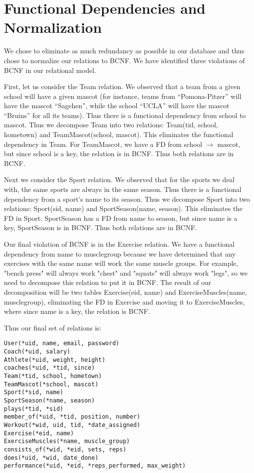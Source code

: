 \documentclass{article}
\begin{document}
\section{Functional Dependencies and Normalization}

We chose to eliminate as much redundancy as possible in our database and thus chose to normalize our relations to BCNF.  We have identified three violations of BCNF in our relational model. 

First, let us consider the Team relation.  We observed that a team from a given school 
will have a given mascot (for instance, teams from ``Pomona-Pitzer'' will have the mascot
``Sagehen'', while the school ``UCLA'' will have the mascot ``Bruins'' for all its teams). Thus there is 
a functional dependency from school to mascot. Thus we decompose Team into two relations:
Team(tid, school, hometown) and TeamMascot(school, mascot). This eliminates the functional
dependency in Team. For TeamMascot, we have a FD from school $\to$ mascot, but since school
is a key, the relation is in BCNF. Thus both relations are in BCNF.

Next we consider the Sport relation. We observed that for the sports we deal with, the same 
sports are always in the same season. Thus there is a functional dependency from a sport's
name to its season. Thus we decompose Sport into two relations: Sport(sid, name) and 
SportSeason(name, season). This eliminates the FD in Sport. SportSeason has a FD from
name to season, but since name is a key, SportSeason is in BCNF. Thus both relations 
are in BCNF. 

Our final violation of BCNF is in the Exercise relation.  We have a functional dependency from name to muscle\underline{\hspace{2mm}}group because we have determined that any exercises with the same name will work the same muscle groups.  For example, "bench press" will always work "chest" and "squats" will always work "legs", so we need to decompose this relation to put it in BCNF.  The result of our decomposition will be two tables Exercise(eid, name) and ExerciseMuscles(name, muscle\underline{\hspace{2mm}}group), eliminating the FD in Exercise and moving it to ExerciseMuscles, where since name is a key, the relation is BCNF.

Thus our final set of relations is:
    \begin{verbatim}
User(*uid, name, email, password)
Coach(*uid, salary)
Athlete(*uid, weight, height)
coaches(*uid, *tid, since)
Team(*tid, school, hometown)
TeamMascot(*school, mascot)
Sport(*sid, name)
SportSeason(*name, season)
plays(*tid, *sid)
member_of(*uid, *tid, position, number)
Workout(*wid, uid, tid, *date_assigned)
Exercise(*eid, name)
ExerciseMuscles(*name, muscle_group)
consists_of(*wid, *eid, sets, reps)
does(*uid, *wid, date_done)
performance(*uid, *eid, *reps_performed, max_weight)
    \end{verbatim}
\end{document}
